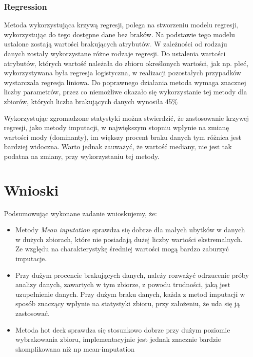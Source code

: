 \documentclass{classrep}
\begin{document}
{{        }

        \subsubsection{Regression}
        \label{summary:regression} {
            Metoda wykorzystująca krzywą regresji, polega na stworzeniu modelu
            regresji, wykorzystując do tego dostępne dane bez braków. Na podstawie tego
            modelu ustalone zostają wartości brakujących atrybutów. W zależności od
            rodzaju danych zostały wykorzystane różne rodzaje regresji. Do ustalenia
            wartości atrybutów, których wartość należała do zbioru określonych
            wartości, jak np. płeć, wykorzystywana była regresja logistyczna, w
            realizacji pozostałych przypadków wystarczała regresja liniowa. Do
            poprawnego działania metoda wymaga znacznej liczby parametrów, przez co
            niemożliwe okazało się wykorzystanie tej metody dla zbiorów, których liczba
            brakujących danych wynosiła 45\%

            Wykorzystując zgromadzone statystyki można stwierdzić, że zastosowanie
            krzywej regresji, jako metody imputacji, w największym stopniu wpłynie na
            zmianę wartości mody (dominanty), im większy procent braku danych tym
            różnica jest bardziej widoczna. Warto jednak zauważyć, że wartość mediany,
            nie jest tak podatna na zmiany, przy wykorzystaniu tej metody.
        }

    }

    \section{Wnioski}
    \label{conclusions} {
        Podsumowując wykonane zadanie wnioskujemy, że:
        \begin{itemize}
            \item Metody \textit{Mean inputation} sprawdza się dobrze dla małych ubytków
            w danych w dużych zbiorach, które nie posiadają dużej liczby wartości
            ekstremalnych. Ze względu na charakterystykę średniej wartości mogą bardzo
            zaburzyć imputacje.
            \item Przy dużym procencie brakujących danych, należy rozważyć odrzucenie
            próby analizy danych, zawartych w tym zbiorze, z powodu trudności,
            jaką jest uzupełnienie danych. Przy dużym braku danych, każda z metod
            imputacji w sposób znaczący wpłynie na statystyki zbioru, przy
            założeniu, że uda się ją zastosować.
            \item Metoda hot deck sprawdza się stosunkowo dobrze przy dużym poziomie
            wybrakowania zbioru, implementacyjnie jest jednak znacznie bardzie
            skomplikowana niż np mean-imputation

        \end{itemize}
    }

    \begin{thebibliography}{0}
    \end{thebibliography}
\end{document}
